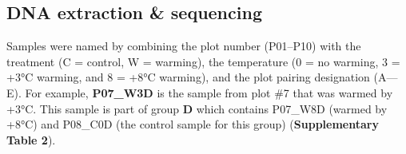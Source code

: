 \documentclass[
  10pt,
  letterpaper,
  DIV=11,
  numbers=noendperiod]{scrartcl}
\begin{document}
\hypertarget{dna-extraction-sequencing}{%
\subsection{DNA extraction \&
sequencing}\label{dna-extraction-sequencing}}

Samples were named by combining the plot number (P01--P10) with the
treatment (C = control, W = warming), the temperature (0 = no warming, 3
= +3°C warming, and 8 = +8°C warming), and the plot pairing designation
(A---E). For example, \textbf{P07\_W3D} is the sample from plot \#7 that
was warmed by +3°C. This sample is part of group \textbf{D} which
contains P07\_W8D (warmed by +8°C) and P08\_C0D (the control sample for
this group) (\textbf{Supplementary Table 2}).

\begin{table}[H]


\end{table}
\end{document}
